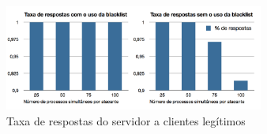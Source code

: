 \begin{figure}[h!]
\centering
\includegraphics[width=0.76\textwidth]{images/blacklistTxResp.png}
\caption{Taxa de respostas do servidor a clientes legítimos}
\label{fig:blacklistTxResp}
\end{figure}
% 



